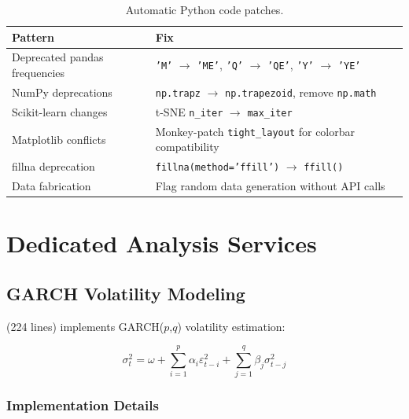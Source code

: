 \begin{table}[H]
\centering
\caption{Automatic Python code patches.}
\label{tab:python-patches}
\begin{tabularx}{\textwidth}{lX}
\toprule
\textbf{Pattern} & \textbf{Fix} \\
\midrule
Deprecated pandas frequencies & \texttt{'M'} $\to$ \texttt{'ME'}, \texttt{'Q'} $\to$ \texttt{'QE'}, \texttt{'Y'} $\to$ \texttt{'YE'} \\
NumPy deprecations & \texttt{np.trapz} $\to$ \texttt{np.trapezoid}, remove \texttt{np.math} \\
Scikit-learn changes & t-SNE \texttt{n\_iter} $\to$ \texttt{max\_iter} \\
Matplotlib conflicts & Monkey-patch \texttt{tight\_layout} for colorbar compatibility \\
fillna deprecation & \texttt{fillna(method='ffill')} $\to$ \texttt{ffill()} \\
Data fabrication & Flag random data generation without API calls \\
\bottomrule
\end{tabularx}
\end{table}

\section{Dedicated Analysis Services}
\label{sec:modeling:services}

\subsection{GARCH Volatility Modeling}

 (224 lines) implements GARCH($p$,$q$) volatility estimation:

\begin{equation}
\sigma_t^2 = \omega + \sum_{i=1}^{p} \alpha_i \varepsilon_{t-i}^2 + \sum_{j=1}^{q} \beta_j \sigma_{t-j}^2
\label{eq:garch}
\end{equation}

\subsubsection{Implementation Details}

